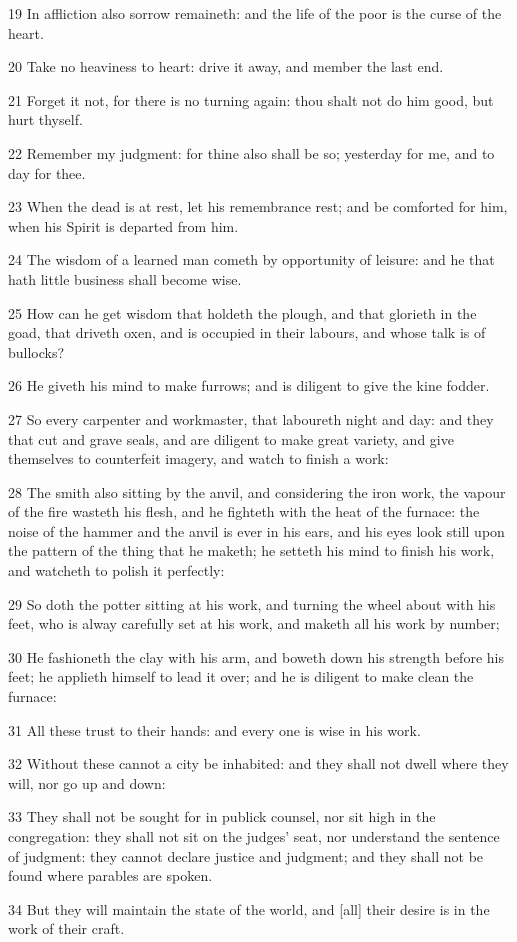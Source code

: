 \par 19 In affliction also sorrow remaineth: and the life of the poor is the curse of the heart.
\par 20 Take no heaviness to heart: drive it away, and member the last end.
\par 21 Forget it not, for there is no turning again: thou shalt not do him good, but hurt thyself.
\par 22 Remember my judgment: for thine also shall be so; yesterday for me, and to day for thee.
\par 23 When the dead is at rest, let his remembrance rest; and be comforted for him, when his Spirit is departed from him.
\par 24 The wisdom of a learned man cometh by opportunity of leisure: and he that hath little business shall become wise.
\par 25 How can he get wisdom that holdeth the plough, and that glorieth in the goad, that driveth oxen, and is occupied in their labours, and whose talk is of bullocks?
\par 26 He giveth his mind to make furrows; and is diligent to give the kine fodder.
\par 27 So every carpenter and workmaster, that laboureth night and day: and they that cut and grave seals, and are diligent to make great variety, and give themselves to counterfeit imagery, and watch to finish a work:
\par 28 The smith also sitting by the anvil, and considering the iron work, the vapour of the fire wasteth his flesh, and he fighteth with the heat of the furnace: the noise of the hammer and the anvil is ever in his ears, and his eyes look still upon the pattern of the thing that he maketh; he setteth his mind to finish his work, and watcheth to polish it perfectly:
\par 29 So doth the potter sitting at his work, and turning the wheel about with his feet, who is alway carefully set at his work, and maketh all his work by number;
\par 30 He fashioneth the clay with his arm, and boweth down his strength before his feet; he applieth himself to lead it over; and he is diligent to make clean the furnace:
\par 31 All these trust to their hands: and every one is wise in his work.
\par 32 Without these cannot a city be inhabited: and they shall not dwell where they will, nor go up and down:
\par 33 They shall not be sought for in publick counsel, nor sit high in the congregation: they shall not sit on the judges' seat, nor understand the sentence of judgment: they cannot declare justice and judgment; and they shall not be found where parables are spoken.
\par 34 But they will maintain the state of the world, and [all] their desire is in the work of their craft.

